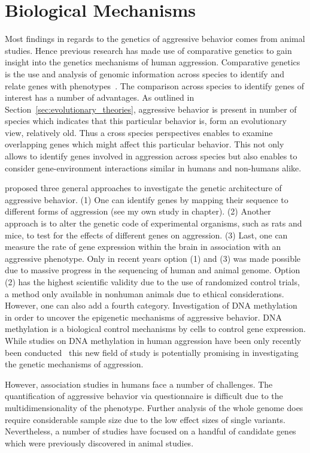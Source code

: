 \section{Biological Mechanisms}
\label{sec:biological_mechanisms}

Most findings in regards to the genetics of aggressive behavior comes from animal studies.
Hence previous research has made use of comparative genetics to gain insight into the genetics mechanisms of human aggression.
Comparative genetics is the use and analysis of genomic information across species to identify and relate genes with phenotypes~\cite{Maxson2003}.
The comparison across species to identify genes of interest has a number of advantages.
As outlined in Section~\ref{sec:evolutionary_theories}, aggressive behavior is present in number of species which indicates that this particular behavior is, form an evolutionary view, relatively old.
Thus a cross species perspectives enables to examine overlapping genes which might affect this particular behavior.
This not only allows to identify genes involved in aggression across species but also enables to consider gene-environment interactions similar in humans and non-humans alike.

\citet{Maxson2005} proposed three general approaches to investigate the genetic architecture of aggressive behavior.
(1) One can identify genes by mapping their sequence to different forms of aggression (see my own study in chapter). %
(2) Another approach is to alter the genetic code of experimental organisms, such as rats and mice, to test for the effects of different genes on aggression.
(3) Last, one can measure the rate of gene expression within the brain in association with an aggressive phenotype.
Only in recent years option (1) and (3) was made possible due to massive progress in the sequencing of human and animal genome.
Option (2) has the highest scientific validity due to the use of randomized control trials, a method only available in nonhuman animals due to ethical considerations.
However, one can also add a fourth category.
Investigation of DNA methylation in order to uncover the epigenetic mechanisms of aggressive behavior.
DNA methylation is a biological control mechanisms by cells to control gene expression.
While studies on DNA methylation in human aggression have been only recently been conducted~\cite{VanDongen2015a} this new field of study is potentially promising in investigating the genetic mechanisms of aggression.

However, association studies in humans face a number of challenges.
The quantification of aggressive behavior via questionnaire is difficult due to the multidimensionality of the phenotype.
Further analysis of the whole genome does require considerable sample size due to the low effect sizes of single variants.
Nevertheless, a number of studies have focused on a handful of candidate genes which were previously discovered in animal studies.

